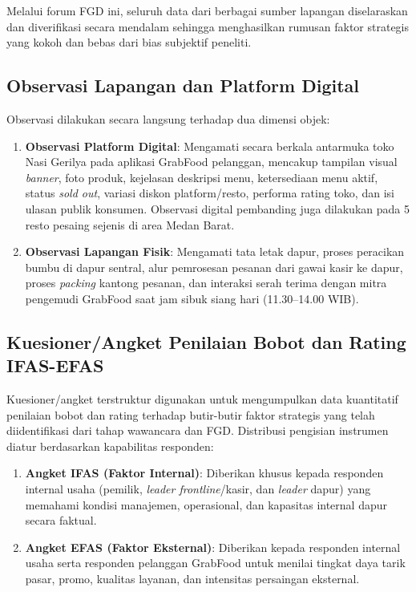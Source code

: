Melalui forum FGD ini, seluruh data dari berbagai sumber lapangan diselaraskan dan diverifikasi secara mendalam sehingga menghasilkan rumusan faktor strategis yang kokoh dan bebas dari bias subjektif peneliti.

\subsection{Observasi Lapangan dan Platform Digital}
Observasi dilakukan secara langsung terhadap dua dimensi objek:
\begin{enumerate}
    \item \textbf{Observasi Platform Digital}: Mengamati secara berkala antarmuka toko Nasi Gerilya pada aplikasi GrabFood pelanggan, mencakup tampilan visual \textit{banner}, foto produk, kejelasan deskripsi menu, ketersediaan menu aktif, status \textit{sold out}, variasi diskon platform/resto, performa rating toko, dan isi ulasan publik konsumen. Observasi digital pembanding juga dilakukan pada 5 resto pesaing sejenis di area Medan Barat.
    \item \textbf{Observasi Lapangan Fisik}: Mengamati tata letak dapur, proses peracikan bumbu di dapur sentral, alur pemrosesan pesanan dari gawai kasir ke dapur, proses \textit{packing} kantong pesanan, dan interaksi serah terima dengan mitra pengemudi GrabFood saat jam sibuk siang hari (11.30--14.00 WIB).
\end{enumerate}

\subsection{Kuesioner/Angket Penilaian Bobot dan Rating IFAS-EFAS}
\label{sec:bab3-angket-tertutup-ifas-efas}
Kuesioner/angket terstruktur digunakan untuk mengumpulkan data kuantitatif penilaian bobot dan rating terhadap butir-butir faktor strategis yang telah diidentifikasi dari tahap wawancara dan FGD. Distribusi pengisian instrumen diatur berdasarkan kapabilitas responden:
\begin{enumerate}
    \item \textbf{Angket IFAS (Faktor Internal)}: Diberikan khusus kepada responden internal usaha (pemilik, \textit{leader frontline}/kasir, dan \textit{leader} dapur) yang memahami kondisi manajemen, operasional, dan kapasitas internal dapur secara faktual.
    \item \textbf{Angket EFAS (Faktor Eksternal)}: Diberikan kepada responden internal usaha serta responden pelanggan GrabFood untuk menilai tingkat daya tarik pasar, promo, kualitas layanan, dan intensitas persaingan eksternal.
\end{enumerate}

